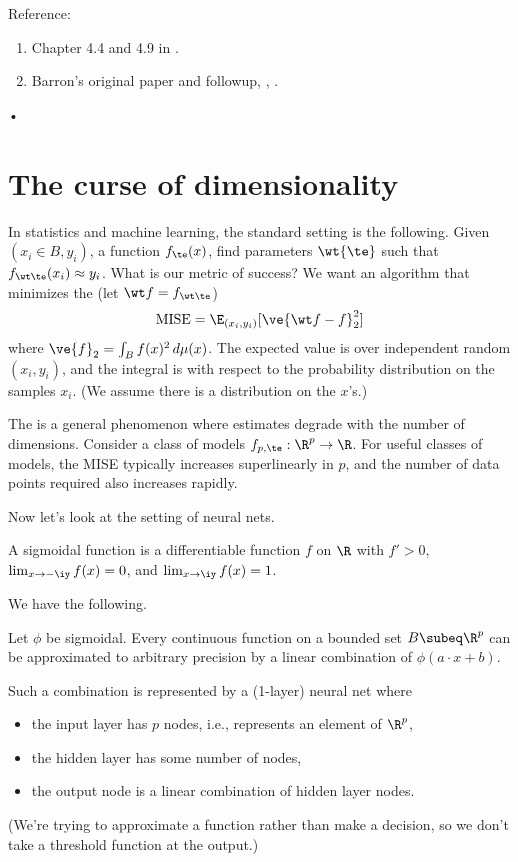 Reference: 
\begin{enumerate}
\item
Chapter 4.4 and 4.9 in \cite{Clarke2009}.
\item
Barron's original paper and followup, \cite{Barron1993}, \cite{Barron1994}.
\end{enumerate}•

\section{The curse of dimensionality}
In statistics and machine learning, the standard setting is the following. Given $(x_i\in B,y_i)$, a function $f_\te(x)$, find parameters $\wt{\te}$ such that $f_{\wt\te}(x_i)\approx y_i$. What is our metric of success? We want an algorithm that minimizes the  (let $\wt f=f_{\wt \te}$)
\[
\text{MISE}%
= \E_{(x_i,y_i)} [\ve{\wt f-f}_2^2] 
\]
where $\ve{f}_2=\int_B f(x)^2\,d\mu(x)$. The expected value is over independent random $(x_i,y_i)$, and the integral is with respect to the probability distribution on the samples $x_i$. (We assume there is a distribution on the $x$'s.) %

The  is a general phenomenon where estimates degrade with the number of dimensions. Consider a class of models $f_{p,\te}:\R^p\to \R$. For useful classes of models, the MISE typically increases superlinearly in $p$, and the number of data points required also increases rapidly.

Now let's look at the setting of neural nets.

\begin{df}
A sigmoidal function is a differentiable function $f$ on $\R$ with $f'>0$, $\lim_{x\to -\iy}f(x)=0$, and $\lim_{x\to \iy}f(x)=1$.
\end{df}

We have the following.
\begin{pr}
Let $\phi$ be sigmoidal. 
Every continuous function on a bounded set $B\subeq \R^p$ can be approximated to arbitrary precision by a linear combination of $\phi(a\cdot x+b)$. 
\end{pr}
Such a combination is represented by a (1-layer) neural net where 
\begin{itemize}
\item
the input layer has $p$ nodes, i.e., represents an element of $\R^p$,
\item
the hidden layer has some number of nodes,
\item
the output node is a linear combination of hidden layer nodes.
\end{itemize}
(We're trying to approximate a function rather than make a decision, so we don't take a threshold function at the output.)

